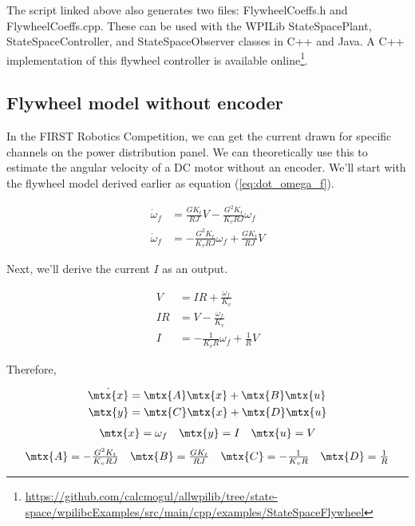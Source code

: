 The script linked above also generates two files: FlywheelCoeffs.h and
FlywheelCoeffs.cpp. These can be used with the WPILib StateSpacePlant,
StateSpaceController, and StateSpaceObserver classes in C++ and Java. A C++
implementation of this flywheel controller is available online\footnote{
\url{https://github.com/calcmogul/allwpilib/tree/state-space/wpilibcExamples/src/main/cpp/examples/StateSpaceFlywheel}}.

\subsection{Flywheel model without encoder}
\label{subsec:flywheel_model_without_encoder}

In the FIRST Robotics Competition, we can get the current drawn for specific
channels on the power distribution panel. We can theoretically use this to
estimate the angular velocity of a DC motor without an encoder. We'll start with
the flywheel model derived earlier as equation (\ref{eq:dot_omega_f}).

\begin{align*}
  \dot{\omega}_f &= \frac{G K_t}{RJ} V - \frac{G^2 K_t}{K_v RJ} \omega_f \\
  \dot{\omega}_f &= -\frac{G^2 K_t}{K_v RJ} \omega_f + \frac{G K_t}{RJ} V
\end{align*}

Next, we'll derive the current $I$ as an output.

\begin{align*}
  V &= IR + \frac{\omega_f}{K_v} \\
  IR &= V - \frac{\omega_f}{K_v} \\
  I &= -\frac{1}{K_v R} \omega_f + \frac{1}{R} V
\end{align*}

Therefore,

\begin{theorem}
  \begin{align*}
    \dot{\mtx{x}} &= \mtx{A} \mtx{x} + \mtx{B} \mtx{u} \\
    \mtx{y} &= \mtx{C} \mtx{x} + \mtx{D} \mtx{u}
  \end{align*}
  \begin{equation*}
    \begin{array}{ccc}
      \mtx{x} = \omega_f &
      \mtx{y} = I &
      \mtx{u} = V
    \end{array}
  \end{equation*}
  \begin{equation}
    \begin{array}{cccc}
      \mtx{A} = -\frac{G^2 K_t}{K_v RJ} &
      \mtx{B} = \frac{G K_t}{RJ} &
      \mtx{C} = -\frac{1}{K_v R} &
      \mtx{D} = \frac{1}{R}
    \end{array}
  \end{equation}
\end{theorem}

